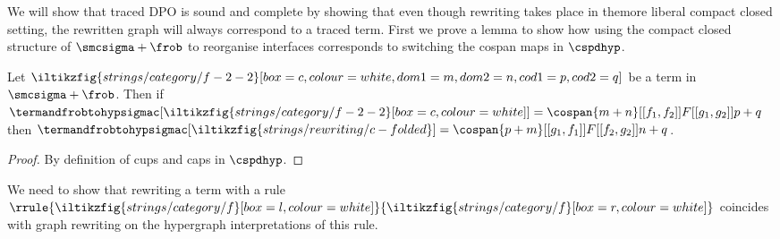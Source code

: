 We will show that traced DPO is sound and complete by showing that even though
rewriting takes place in themore liberal compact closed setting, the rewritten
graph will always correspond to a traced term.
First we prove a lemma to show how using the compact closed structure of
\(\smcsigma + \frob\) to reorganise interfaces corresponds to switching the
cospan maps in \(\cspdhyp\).

\begin{lemma}\label{lem:switch-interfaces}
    Let \(
    \iltikzfig{strings/category/f-2-2}[box=c,colour=white,dom1=m,dom2=n,cod1=p,cod2=q]
    \) be a term in \(\smcsigma + \frob\).
    Then if \(
    \termandfrobtohypsigmac[
        \iltikzfig{strings/category/f-2-2}[box=c,colour=white]
    ]
    =
    \cospan{m + n}[[f_1,f_2]]{F}[[g_1,g_2]]{p + q}
    \) then \(
    \termandfrobtohypsigmac[
        \iltikzfig{strings/rewriting/c-folded}
    ]
    =
    \cospan{p + m}[[g_1,f_1]]{F}[[f_2,g_2]]{n + q}
    \).
\end{lemma}
\begin{proof}
    By definition of cups and caps in \(\cspdhyp\).
\end{proof}

We need to show that rewriting a term with a rule \(\rrule{
    \iltikzfig{strings/category/f}[box=l,colour=white]
}{
    \iltikzfig{strings/category/f}[box=r,colour=white]
}\) coincides with graph rewriting on the hypergraph interpretations of
this rule.

